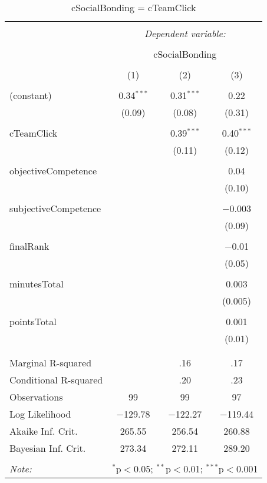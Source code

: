 
\begin{table}[!htbp] \centering 
  \caption{cSocialBonding = cTeamClick} 
  \label{tab:MLM22acClickcBonding} 
\begin{tabular}{@{\extracolsep{5pt}}lccc} 
\\[-1.8ex]\hline 
\hline \\[-1.8ex] 
 & \multicolumn{3}{c}{\textit{Dependent variable:}} \\ 
\cline{2-4} 
\\[-1.8ex] & \multicolumn{3}{c}{cSocialBonding} \\ 
\\[-1.8ex] & (1) & (2) & (3)\\ 
\hline \\[-1.8ex] 
 (constant) & 0.34$^{***}$ & 0.31$^{***}$ & 0.22 \\ 
  & (0.09) & (0.08) & (0.31) \\ 
  & & & \\ 
 cTeamClick &  & 0.39$^{***}$ & 0.40$^{***}$ \\ 
  &  & (0.11) & (0.12) \\ 
  & & & \\ 
 objectiveCompetence &  &  & 0.04 \\ 
  &  &  & (0.10) \\ 
  & & & \\ 
 subjectiveCompetence &  &  & $-$0.003 \\ 
  &  &  & (0.09) \\ 
  & & & \\ 
 finalRank &  &  & $-$0.01 \\ 
  &  &  & (0.05) \\ 
  & & & \\ 
 minutesTotal &  &  & 0.003 \\ 
  &  &  & (0.005) \\ 
  & & & \\ 
 pointsTotal &  &  & 0.001 \\ 
  &  &  & (0.01) \\ 
  & & & \\ 
\hline \\[-1.8ex] 
Marginal R-squared &  & .16 & .17 \\ 
Conditional R-squared &  & .20 & .23 \\ 
Observations & 99 & 99 & 97 \\ 
Log Likelihood & $-$129.78 & $-$122.27 & $-$119.44 \\ 
Akaike Inf. Crit. & 265.55 & 256.54 & 260.88 \\ 
Bayesian Inf. Crit. & 273.34 & 272.11 & 289.20 \\ 
\hline 
\hline \\[-1.8ex] 
\textit{Note:}  & \multicolumn{3}{r}{$^{*}$p$<$0.05; $^{**}$p$<$0.01; $^{***}$p$<$0.001} \\ 
\end{tabular} 
\end{table} 

